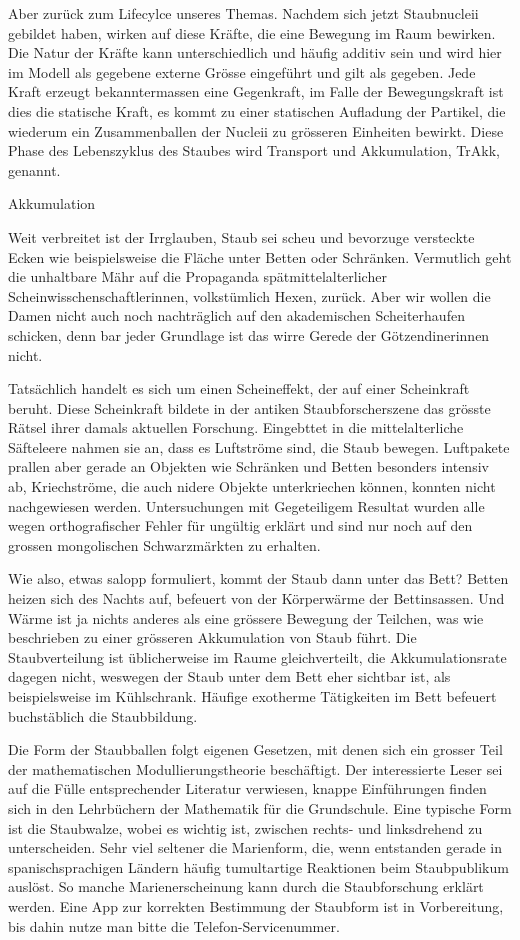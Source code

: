 Aber zurück zum Lifecylce unseres Themas. Nachdem sich jetzt Staubnucleii gebildet haben, wirken auf diese Kräfte, die eine Bewegung im Raum bewirken. Die Natur der Kräfte kann unterschiedlich und häufig additiv sein und wird hier im Modell als gegebene externe Grösse eingeführt und gilt als gegeben. Jede Kraft erzeugt bekanntermassen eine Gegenkraft, im Falle der Bewegungskraft ist dies die statische Kraft, es kommt zu einer statischen Aufladung der Partikel, die wiederum ein Zusammenballen der Nucleii zu grösseren Einheiten bewirkt. Diese Phase des Lebenszyklus des Staubes wird Transport und Akkumulation, TrAkk, genannt. 

Akkumulation 

Weit verbreitet ist der Irrglauben, Staub sei scheu und bevorzuge versteckte Ecken wie beispielsweise die Fläche unter Betten oder Schränken. Vermutlich geht die unhaltbare Mähr auf die Propaganda spätmittelalterlicher Scheinwisschenschaftlerinnen, volkstümlich Hexen, zurück. Aber wir wollen die Damen nicht auch noch nachträglich auf den akademischen Scheiterhaufen schicken, denn bar jeder Grundlage ist das wirre Gerede der Götzendinerinnen nicht. 

Tatsächlich handelt es sich um einen Scheineffekt, der auf einer Scheinkraft beruht. Diese Scheinkraft bildete in der antiken Staubforscherszene das grösste Rätsel ihrer damals aktuellen Forschung. Eingebttet in die mittelalterliche Säfteleere nahmen sie an, dass es Luftströme sind, die Staub bewegen. Luftpakete prallen aber gerade an Objekten wie Schränken und Betten besonders intensiv ab, Kriechströme, die auch nidere Objekte unterkriechen können, konnten nicht nachgewiesen werden. Untersuchungen mit Gegeteiligem Resultat wurden alle wegen orthografischer Fehler für ungültig erklärt und sind nur noch auf den grossen mongolischen Schwarzmärkten zu erhalten. 

Wie also, etwas salopp formuliert, kommt der Staub dann unter das Bett? Betten heizen sich des Nachts auf, befeuert von der Körperwärme der Bettinsassen. Und Wärme ist ja nichts anderes als eine grössere Bewegung der Teilchen, was wie beschrieben zu einer grösseren Akkumulation von Staub führt. Die Staubverteilung ist üblicherweise im Raume gleichverteilt, die Akkumulationsrate dagegen nicht, weswegen der Staub unter dem Bett eher sichtbar ist, als beispielsweise im Kühlschrank. Häufige exotherme Tätigkeiten im Bett befeuert buchstäblich die Staubbildung.

Die Form der Staubballen folgt eigenen Gesetzen, mit denen sich ein grosser Teil der mathematischen Modullierungstheorie beschäftigt. Der interessierte Leser sei auf die Fülle entsprechender Literatur verwiesen, knappe Einführungen finden sich in den Lehrbüchern der Mathematik für die Grundschule. Eine typische Form ist die Staubwalze, wobei es wichtig ist, zwischen rechts- und linksdrehend zu unterscheiden. Sehr viel seltener die Marienform, die, wenn entstanden gerade in spanischsprachigen Ländern häufig tumultartige Reaktionen beim Staubpublikum auslöst. So manche Marienerscheinung kann durch die Staubforschung erklärt werden. Eine App zur korrekten Bestimmung der Staubform ist in Vorbereitung, bis dahin nutze man bitte die Telefon-Servicenummer.

